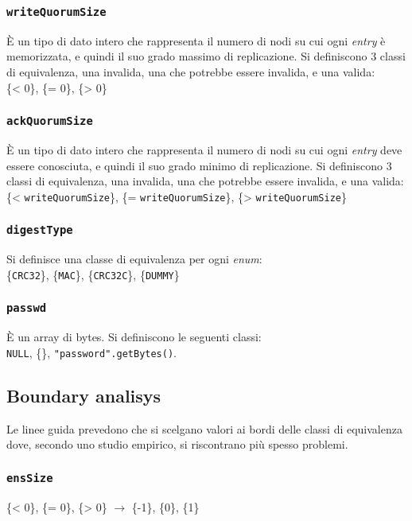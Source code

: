 \documentclass[a4paper, 12pt]{article}
\newcommand{\key}[1]{\texttt{#1}}
\begin{document}
\subsubsection{\key{writeQuorumSize}}
È un tipo di dato intero che rappresenta il numero di nodi su cui ogni \textit{entry} è memorizzata, e quindi il suo grado massimo di replicazione. Si definiscono 3 classi di equivalenza, una invalida, una che potrebbe essere invalida, e una valida:\\
\{< 0\}, \{= 0\}, \{> 0\}

\subsubsection{\key{ackQuorumSize}}
È un tipo di dato intero che rappresenta il numero di nodi su cui ogni \textit{entry} deve essere conosciuta, e quindi il suo grado minimo di replicazione. Si definiscono 3 classi di equivalenza, una invalida, una che potrebbe essere invalida, e una valida:\\
\{< \key{writeQuorumSize}\}, \{= \key{writeQuorumSize}\}, \{> \key{writeQuorumSize}\}

\subsubsection{\key{digestType}}
Si definisce una classe di equivalenza per ogni \textit{enum}:\\
\{\key{CRC32}\}, \{\key{MAC}\}, \{\key{CRC32C}\}, \{\key{DUMMY}\}

\subsubsection{\key{passwd}}
È un array di bytes. Si definiscono le seguenti classi:\\
\key{NULL}, \{\}, \key{"password".getBytes()}.


\subsection{Boundary analisys}
Le linee guida prevedono che si scelgano valori ai bordi delle classi di equivalenza dove, secondo uno studio empirico, si riscontrano più spesso problemi. 

\subsubsection{\key{ensSize}}
\{< 0\}, \{= 0\}, \{> 0\} $\rightarrow$ \{-1\}, \{0\}, \{1\}
\end{document}
